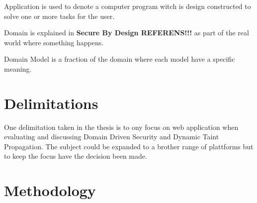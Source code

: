 \begin{definition}{Application} 
	is used to denote a computer program witch is design constructed to solve one or more tasks for the user.
\end{definition}

\begin{definition}{Domain}
	is explained in \textbf{Secure By Design REFERENS!!!} as part of the real world where something happens.
\end{definition}

\begin{definition}{Domain Model}
	is a fraction of the domain where each model have a specific meaning.
\end{definition}


\section{Delimitations}
One delimitation taken in the thesis is to ony focus on web application when evaluating and discussing Domain Driven Security and Dynamic Taint Propagation. The subject could be expanded to a brother range of plattforms but to keep the focus have the decision been made.


\section{Methodology}
